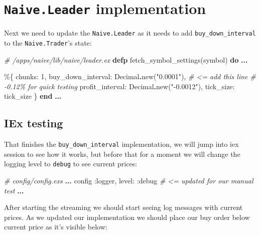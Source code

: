 \documentclass[
]{book}
\newenvironment{Shaded}{\begin{snugshade}}{\end{snugshade}}
\newcommand{\CommentTok}[1]{\textcolor[rgb]{0.56,0.35,0.01}{\textit{#1}}}
\newcommand{\ConstantTok}[1]{\textcolor[rgb]{0.00,0.00,0.00}{#1}}
\newcommand{\DecValTok}[1]{\textcolor[rgb]{0.00,0.00,0.81}{#1}}
\newcommand{\KeywordTok}[1]{\textcolor[rgb]{0.13,0.29,0.53}{\textbf{#1}}}
\newcommand{\NormalTok}[1]{#1}
\newcommand{\OperatorTok}[1]{\textcolor[rgb]{0.81,0.36,0.00}{\textbf{#1}}}
\newcommand{\StringTok}[1]{\textcolor[rgb]{0.31,0.60,0.02}{#1}}
\newcommand{\VariableTok}[1]{\textcolor[rgb]{0.00,0.00,0.00}{#1}}
\begin{document}
\hypertarget{naive.leader-implementation}{%
\section{\texorpdfstring{\texttt{Naive.Leader} implementation}{Naive.Leader implementation}}\label{naive.leader-implementation}}

Next we need to update the \texttt{Naive.Leader} as it needs to add \texttt{buy\_down\_interval} to the \texttt{Naive.Trader}'s state:

\begin{Shaded}
\begin{Highlighting}[]
  \CommentTok{\# /apps/naive/lib/naive/leader.ex}
  \KeywordTok{defp}\NormalTok{ fetch\_symbol\_settings(symbol) }\KeywordTok{do}
    \OperatorTok{...}

\NormalTok{    \%\{}
      \VariableTok{chunks:} \DecValTok{1}\NormalTok{,}
      \VariableTok{buy\_down\_interval:} \ConstantTok{Decimal}\OperatorTok{.}\NormalTok{new(}\StringTok{"0.0001"}\NormalTok{), }\CommentTok{\# \textless{}= add this line}
      \CommentTok{\# {-}0.12\% for quick testing}
      \VariableTok{profit\_interval:} \ConstantTok{Decimal}\OperatorTok{.}\NormalTok{new(}\StringTok{"{-}0.0012"}\NormalTok{),}
      \VariableTok{tick\_size:}\NormalTok{ tick\_size}
\NormalTok{    \}}
  \KeywordTok{end}  
  \OperatorTok{...}
\end{Highlighting}
\end{Shaded}

\hypertarget{iex-testing-1}{%
\subsection{IEx testing}\label{iex-testing-1}}

That finishes the \texttt{buy\_down\_interval} implementation, we will jump into iex session to see how it works, but before that for a moment we will change the logging level to \texttt{debug} to see current prices:

\begin{Shaded}
\begin{Highlighting}[]
\CommentTok{\# config/config.exs}
\OperatorTok{...}
\NormalTok{config }\VariableTok{:logger}\NormalTok{,}
  \VariableTok{level:} \VariableTok{:debug} \CommentTok{\# \textless{}= updated for our manual test}
\OperatorTok{...}
\end{Highlighting}
\end{Shaded}

After starting the streaming we should start seeing log messages with current prices. As we updated our implementation we should place our buy order below current price as it's visible below:
\end{document}
